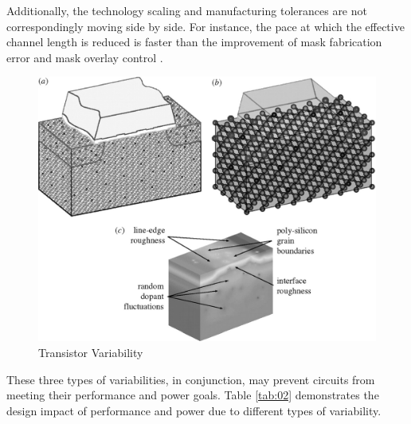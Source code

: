 \documentclass[ecp,tc, english]{iiufrgs}
\begin{document}
Additionally, the technology scaling and manufacturing tolerances are not correspondingly moving side by side. For instance, the pace at which the effective channel length is reduced is faster than the improvement of mask fabrication error and mask overlay control \cite{nassif:08} \cite{aghababa2009static}.

\begin{figure}[H]
\centering
\includegraphics[width=\textwidth]{transistorVariability.jpg}
\caption{Transistor Variability}
\label{fig:Fig2}
\end{figure}

These three types of variabilities, in conjunction, may prevent circuits from meeting their performance and power goals. Table \ref{tab:02} demonstrates the design impact of performance and power due to different types of variability.

\begin{table}[H]
\centering
\caption{Design impact on performance and power due to different types of variability}
\label{tab:02}
\end{table}
\end{document}
